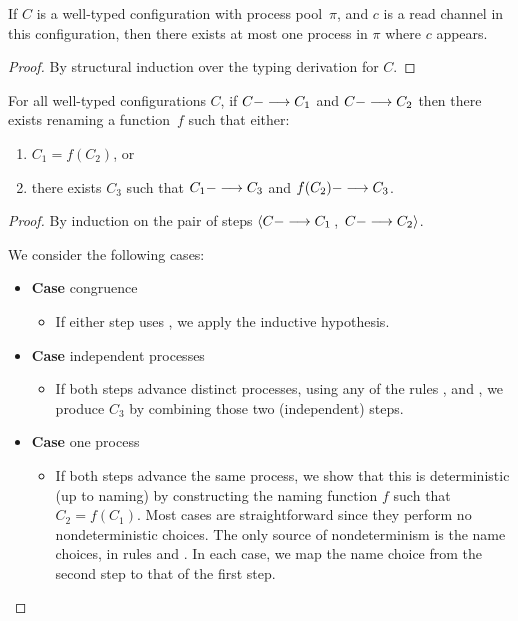 \begin{lemma}
\label{lem:UniqueReader}
If $C$ is a well-typed configuration with process pool~$\pi$, 
and $c$ is a read channel in this configuration,
then there exists at most one process in $\pi$ where $c$ appears.
\begin{proof}
By structural induction over the typing derivation for $C$.
\end{proof}
\end{lemma}

\begin{theorem}\label{lem:single-step-confluence}
For all well-typed configurations $C$,
%
 if $C ---> C_1$ 
and $C ---> C_2$ 
then 
there exists renaming a function~$f$ 
such that either:
\begin{enumerate}
\item %
$C_1 = f(C_2)$,
or
\item there exists $C_3$ such that $C_1 ---> C_3$ and $f(C_2) ---> C_3$.
\end{enumerate}
\begin{proof}
   By induction on the pair of steps 
   $\left< C ---> C_1\right.$, 
   $\left.C ---> C_2 \right>$.

   We consider the following cases:
   \begin{itemize}[leftmargin=*]
   \item[] \textbf{Case} congruence
     \begin{itemize}[leftmargin=*]
       \item[] If either step uses , we apply
     the inductive hypothesis.
     \end{itemize}     

   \item[] \textbf{Case} independent processes
     \begin{itemize}[leftmargin=*]
       \item[] If both steps advance distinct processes, using any of the rules
         ,  and , we produce $C_3$ by combining
         those two (independent) steps.
     \end{itemize}


   \item[] \textbf{Case} one process
     \begin{itemize}[leftmargin=*]
       \item[] If both steps advance the same process, we show that this is
         deterministic (up to naming) by constructing the naming function $f$
         such that $C_2 = f(C_1)$.  Most cases are straightforward since they
         perform no nondeterministic choices.  The only source of nondeterminism
         is the name choices, in rules  and . In each case,
         we map the name choice from the second step to that of the first step.
     \end{itemize}


\end{itemize}
\end{proof}
\end{theorem}
